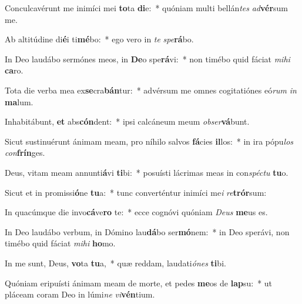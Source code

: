 \item Conculcavérunt me inimíci mei \textbf{to}ta \textbf{di}e:~* quóniam multi bellán\textit{tes} \textit{ad}\textbf{vér}sum me.
\item Ab altitúdine di\textbf{é}i ti\textbf{mé}bo:~* ego vero in \textit{te} \textit{spe}\textbf{rá}bo.
\item In Deo laudábo sermónes meos, in \textbf{De}o spe\textbf{rá}vi:~* non timébo quid fáciat \textit{mi}\textit{hi} \textbf{ca}ro.
\item Tota die verba mea ex\textbf{se}cra\textbf{bán}tur:~* advérsum me omnes cogitatiónes eó\textit{rum} \textit{in} \textbf{ma}lum.
\item Inhabitábunt, \textbf{et} abs\textbf{cón}dent:~* ipsi calcáneum meum \textit{ob}\textit{ser}\textbf{vá}bunt.
\item Sicut sustinuérunt ánimam meam, pro níhilo salvos \textbf{fá}cies \textbf{il}los:~* in ira pópu\textit{los} \textit{con}\textbf{frín}ges.
\item Deus, vitam meam annunti\textbf{á}vi \textbf{ti}bi:~* posuísti lácrimas meas in con\textit{spéc}\textit{tu} \textbf{tu}o.
\item Sicut et in promissi\textbf{ó}ne \textbf{tu}a:~* tunc converténtur inimíci me\textit{i} \textit{re}\textbf{trór}sum:
\item In quacúmque die invo\textbf{cá}ve\textbf{ro} te:~* ecce cognóvi quóniam \textit{De}\textit{us} \textbf{me}us es.
\item In Deo laudábo verbum, in Dómino lau\textbf{dá}bo ser\textbf{mó}nem:~* in Deo sperávi, non timébo quid fáciat \textit{mi}\textit{hi} \textbf{ho}mo.
\item In me sunt, Deus, \textbf{vo}ta \textbf{tu}a,~* quæ reddam, laudati\textit{ó}\textit{nes} \textbf{ti}bi.
\item Quóniam eripuísti ánimam meam de morte, et pedes \textbf{me}os de \textbf{lap}su:~* ut pláceam coram Deo in lúmi\textit{ne} \textit{vi}\textbf{vén}tium.
